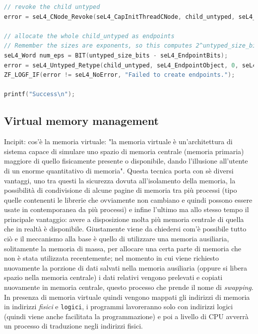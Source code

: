 \begin{lstlisting}[language=C++]
// revoke the child untyped
error = seL4_CNode_Revoke(seL4_CapInitThreadCNode, child_untyped, seL4_WordBits);

// allocate the whole child_untyped as endpoints
// Remember the sizes are exponents, so this computes 2^untyped_size_bits / 2^seL4_EndpointBits:
seL4_Word num_eps = BIT(untyped_size_bits - seL4_EndpointBits);
error = seL4_Untyped_Retype(child_untyped, seL4_EndpointObject, 0, seL4_CapInitThreadCNode, 0, 0, child_tcb, num_eps);
ZF_LOGF_IF(error != seL4_NoError, "Failed to create endpoints.");

printf("Success\n");
\end{lstlisting}

\subsection{Virtual memory management}
Incipit: cos'è la memoria virtuale: "la memoria virtuale è un'architettura di sistema capace di simulare uno spazio di memoria centrale (memoria primaria) maggiore di quello fisicamente presente o disponibile, dando l'illusione all'utente di un enorme quantitativo di memoria". \cite{MemoriaVirtuale} Questa tecnica porta con sè diversi vantaggi, uno tra questi la sicurezza dovuta all'isolamento della memoria, la possibilità di condivisione di alcune pagine di memoria tra più processi (tipo quelle contenenti le librerie che ovviamente non cambiano e quindi possono essere usate in contemporanea da più processi) e infine l'ultimo ma allo stesso tempo il principale vantaggio: avere a disposizione molta più memoria centrale di quella che in realtà è disponibile. Giustamente viene da chiedersi com'è possibile tutto ciò e il meccanismo alla base è quello di utilizzare una memoria ausiliaria, solitamente la memoria di massa, per allocare una certa parte di memoria che non è stata utilizzata recentemente; nel momento in cui viene richiesto nuovamente la porzione di dati salvati nella memoria ausiliaria (oppure si libera spazio nella memoria centrale) i dati relativi vengono prelevati e copiati nuovamente in memoria centrale, questo processo che prende il nome di \textit{swapping}. In presenza di memoria virtuale quindi vengono mappati gli indirizzi di memoria in indirizzi \textit{fisici} e \texttt{logici}, i programmi lavoreranno solo con indirizzi logici (quindi viene anche facilitata la programmazione) e poi a livello di CPU avverrà un processo di traduzione negli indirizzi fisici.\\
